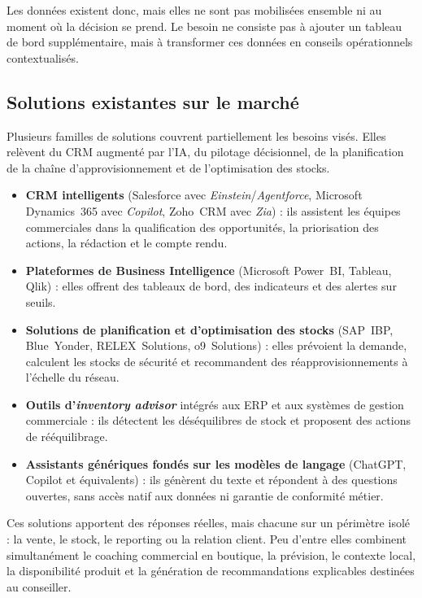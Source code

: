 Les données existent donc, mais elles ne sont pas mobilisées ensemble ni au moment où la décision se prend. Le besoin ne consiste pas à ajouter un tableau de bord supplémentaire, mais à transformer ces données en conseils opérationnels contextualisés.

\subsection{Solutions existantes sur le marché}

Plusieurs familles de solutions couvrent partiellement les besoins visés. Elles relèvent du CRM augmenté par l'IA, du pilotage décisionnel, de la planification de la chaîne d'approvisionnement et de l'optimisation des stocks.

\begin{itemize}[label=--]
    \item \textbf{CRM intelligents} (Salesforce avec \textit{Einstein}/\textit{Agentforce}, Microsoft Dynamics~365 avec \textit{Copilot}, Zoho~CRM avec \textit{Zia}) : ils assistent les équipes commerciales dans la qualification des opportunités, la priorisation des actions, la rédaction et le compte rendu.
    \item \textbf{Plateformes de Business Intelligence} (Microsoft Power~BI, Tableau, Qlik) : elles offrent des tableaux de bord, des indicateurs et des alertes sur seuils.
    \item \textbf{Solutions de planification et d'optimisation des stocks} (SAP~IBP, Blue~Yonder, RELEX~Solutions, o9~Solutions) : elles prévoient la demande, calculent les stocks de sécurité et recommandent des réapprovisionnements à l'échelle du réseau.
    \item \textbf{Outils d'\textit{inventory advisor}} intégrés aux ERP et aux systèmes de gestion commerciale : ils détectent les déséquilibres de stock et proposent des actions de rééquilibrage.
    \item \textbf{Assistants génériques fondés sur les modèles de langage} (ChatGPT, Copilot et équivalents) : ils génèrent du texte et répondent à des questions ouvertes, sans accès natif aux données ni garantie de conformité métier.
\end{itemize}

Ces solutions apportent des réponses réelles, mais chacune sur un périmètre isolé : la vente, le stock, le reporting ou la relation client. Peu d'entre elles combinent simultanément le coaching commercial en boutique, la prévision, le contexte local, la disponibilité produit et la génération de recommandations explicables destinées au conseiller.

